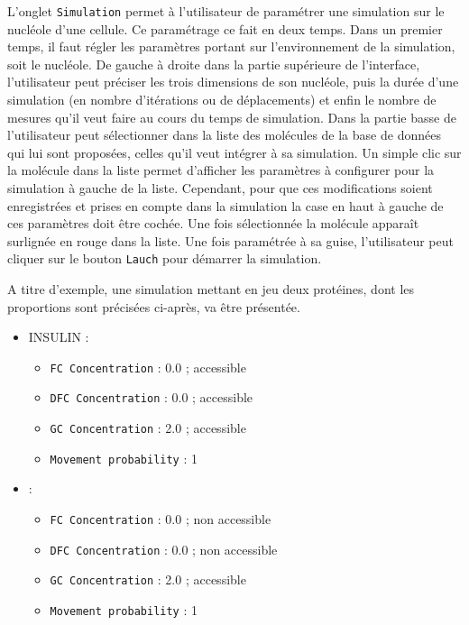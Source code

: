 L'onglet \texttt{Simulation} permet à l'utilisateur de paramétrer une
simulation sur le nucléole d'une cellule. Ce paramétrage ce fait en
deux temps. Dans un premier temps, il faut régler les paramètres
portant sur l'environnement de la simulation, soit le nucléole. De
gauche à droite dans la partie supérieure de l'interface,
l'utilisateur peut préciser les trois dimensions de son nucléole, puis
la durée d'une simulation (en nombre d'itérations ou de déplacements)
et enfin le nombre de mesures qu'il veut faire au cours du temps de
simulation. Dans la partie basse de \NQ l'utilisateur peut
sélectionner dans la liste des molécules de la base de données qui lui
sont proposées, celles qu'il veut intégrer à sa simulation. Un simple
clic sur la molécule dans la liste permet d'afficher les paramètres à
configurer pour la simulation à gauche de la liste. Cependant, pour
que ces modifications soient enregistrées et prises en compte dans la
simulation la case en haut à gauche de ces paramètres doit être
cochée. Une fois sélectionnée la molécule apparaît surlignée en rouge
dans la liste. Une fois paramétrée à sa guise, l'utilisateur peut
cliquer sur le bouton \texttt{Lauch} pour démarrer la simulation.

A titre d'exemple, une simulation mettant en jeu deux protéines, dont
les proportions sont précisées ci-après, va être présentée.

\begin{itemize}
	\item INSULIN : 
	\begin{itemize}
		\item \texttt{FC Concentration} : 0.0 ; accessible
		\item \texttt{DFC Concentration} : 0.0 ; accessible
		\item \texttt{GC Concentration} : 2.0 ; accessible
		\item \texttt{Movement probability} : 1
	\end{itemize}
	\item : 
	\begin{itemize}
		\item \texttt{FC Concentration} : 0.0 ; non accessible
		\item \texttt{DFC Concentration} : 0.0 ; non accessible
		\item \texttt{GC Concentration} : 2.0 ; accessible
		\item \texttt{Movement probability} : 1
	\end{itemize}
\end{itemize}

